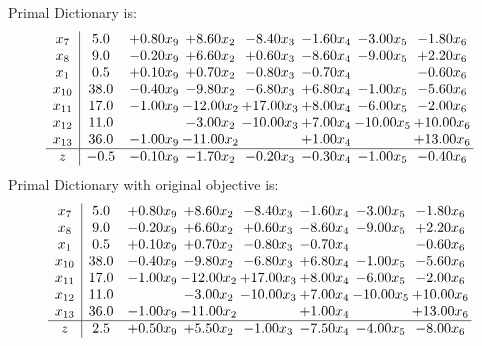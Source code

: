 \documentclass[8pt]{article}
\begin{document}
Primal Dictionary is:
\[\begin{array}{c| c c@{\hskip 2pt} c@{\hskip 2pt} c@{\hskip 2pt} c@{\hskip 2pt} c@{\hskip 2pt} c@{\hskip 2pt} }
 x_{7}   &  5.0 & +  0.80 x_{9} & +  8.60 x_{2} & -8.40 x_{3} & -1.60 x_{4} & -3.00 x_{5} & -1.80 x_{6}\\
 x_{8}   &  9.0 & -0.20 x_{9} & +  6.60 x_{2} & +  0.60 x_{3} & -8.60 x_{4} & -9.00 x_{5} & +  2.20 x_{6}\\
 x_{1}   &  0.5 & +  0.10 x_{9} & +  0.70 x_{2} & -0.80 x_{3} & -0.70 x_{4} &   & -0.60 x_{6}\\
 x_{10}   &  38.0 & -0.40 x_{9} & -9.80 x_{2} & -6.80 x_{3} & +  6.80 x_{4} & -1.00 x_{5} & -5.60 x_{6}\\
 x_{11}   &  17.0 & -1.00 x_{9} & -12.00 x_{2} & + 17.00 x_{3} & +  8.00 x_{4} & -6.00 x_{5} & -2.00 x_{6}\\
 x_{12}   &  11.0  &   & -3.00 x_{2} & -10.00 x_{3} & +  7.00 x_{4} & -10.00 x_{5} & + 10.00 x_{6}\\
 x_{13}   &  36.0 & -1.00 x_{9} & -11.00 x_{2} &   & +  1.00 x_{4} &   & + 13.00 x_{6}\\
\hline
z    &  -0.5 & -0.10 x_{9} & -1.70 x_{2} & -0.20 x_{3} & -0.30 x_{4} & -1.00 x_{5} & -0.40 x_{6}\\
\end{array}\]
Primal Dictionary with original objective is:
\[\begin{array}{c| c c@{\hskip 2pt} c@{\hskip 2pt} c@{\hskip 2pt} c@{\hskip 2pt} c@{\hskip 2pt} c@{\hskip 2pt} }
 x_{7}   &  5.0 & +  0.80 x_{9} & +  8.60 x_{2} & -8.40 x_{3} & -1.60 x_{4} & -3.00 x_{5} & -1.80 x_{6}\\
 x_{8}   &  9.0 & -0.20 x_{9} & +  6.60 x_{2} & +  0.60 x_{3} & -8.60 x_{4} & -9.00 x_{5} & +  2.20 x_{6}\\
 x_{1}   &  0.5 & +  0.10 x_{9} & +  0.70 x_{2} & -0.80 x_{3} & -0.70 x_{4} &   & -0.60 x_{6}\\
 x_{10}   &  38.0 & -0.40 x_{9} & -9.80 x_{2} & -6.80 x_{3} & +  6.80 x_{4} & -1.00 x_{5} & -5.60 x_{6}\\
 x_{11}   &  17.0 & -1.00 x_{9} & -12.00 x_{2} & + 17.00 x_{3} & +  8.00 x_{4} & -6.00 x_{5} & -2.00 x_{6}\\
 x_{12}   &  11.0  &   & -3.00 x_{2} & -10.00 x_{3} & +  7.00 x_{4} & -10.00 x_{5} & + 10.00 x_{6}\\
 x_{13}   &  36.0 & -1.00 x_{9} & -11.00 x_{2} &   & +  1.00 x_{4} &   & + 13.00 x_{6}\\
\hline
z    &  2.5 & +  0.50 x_{9} & +  5.50 x_{2} & -1.00 x_{3} & -7.50 x_{4} & -4.00 x_{5} & -8.00 x_{6}\\
\end{array}\]
\end{document}

